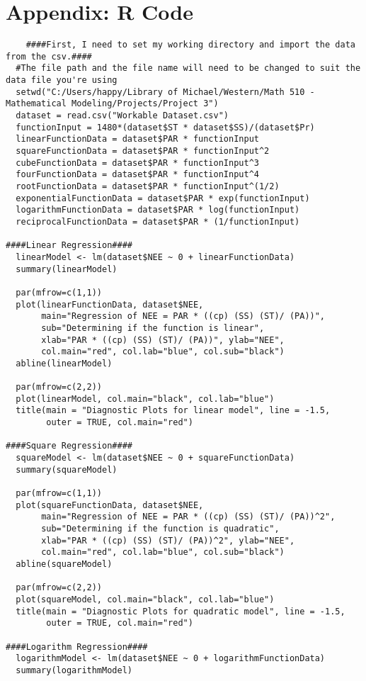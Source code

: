 \documentclass{article}
\begin{document}
\section{Appendix: R Code}
\begin{verbatim}
    ####First, I need to set my working directory and import the data from the csv.####
  #The file path and the file name will need to be changed to suit the data file you're using
  setwd("C:/Users/happy/Library of Michael/Western/Math 510 - Mathematical Modeling/Projects/Project 3")
  dataset = read.csv("Workable Dataset.csv")
  functionInput = 1480*(dataset$ST * dataset$SS)/(dataset$Pr)
  linearFunctionData = dataset$PAR * functionInput
  squareFunctionData = dataset$PAR * functionInput^2
  cubeFunctionData = dataset$PAR * functionInput^3
  fourFunctionData = dataset$PAR * functionInput^4
  rootFunctionData = dataset$PAR * functionInput^(1/2)
  exponentialFunctionData = dataset$PAR * exp(functionInput)
  logarithmFunctionData = dataset$PAR * log(functionInput)
  reciprocalFunctionData = dataset$PAR * (1/functionInput)
  
####Linear Regression####
  linearModel <- lm(dataset$NEE ~ 0 + linearFunctionData)
  summary(linearModel)

  par(mfrow=c(1,1))
  plot(linearFunctionData, dataset$NEE, 
       main="Regression of NEE = PAR * ((cp) (SS) (ST)/ (PA))", 
       sub="Determining if the function is linear",
       xlab="PAR * ((cp) (SS) (ST)/ (PA))", ylab="NEE",
       col.main="red", col.lab="blue", col.sub="black")
  abline(linearModel)

  par(mfrow=c(2,2))
  plot(linearModel, col.main="black", col.lab="blue")
  title(main = "Diagnostic Plots for linear model", line = -1.5, 
        outer = TRUE, col.main="red")
  
####Square Regression####
  squareModel <- lm(dataset$NEE ~ 0 + squareFunctionData)
  summary(squareModel)
  
  par(mfrow=c(1,1))
  plot(squareFunctionData, dataset$NEE, 
       main="Regression of NEE = PAR * ((cp) (SS) (ST)/ (PA))^2", 
       sub="Determining if the function is quadratic",
       xlab="PAR * ((cp) (SS) (ST)/ (PA))^2", ylab="NEE",
       col.main="red", col.lab="blue", col.sub="black")
  abline(squareModel)
  
  par(mfrow=c(2,2))
  plot(squareModel, col.main="black", col.lab="blue")
  title(main = "Diagnostic Plots for quadratic model", line = -1.5, 
        outer = TRUE, col.main="red")
  
####Logarithm Regression####
  logarithmModel <- lm(dataset$NEE ~ 0 + logarithmFunctionData)
  summary(logarithmModel)
  

\end{verbatim}
\end{document}
